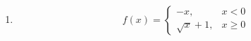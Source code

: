 \documentclass{ximera}
\begin{document}
\begin{problem}
\begin{solution}
\begin{enumerate}
  \item[(b)] $$f(x) = \begin{cases} -x, & x < 0\\ \sqrt{x}+1, & x \geq 0 \end{cases}$$
\end{enumerate}
\end{solution}
\end{problem}
\end{document}
